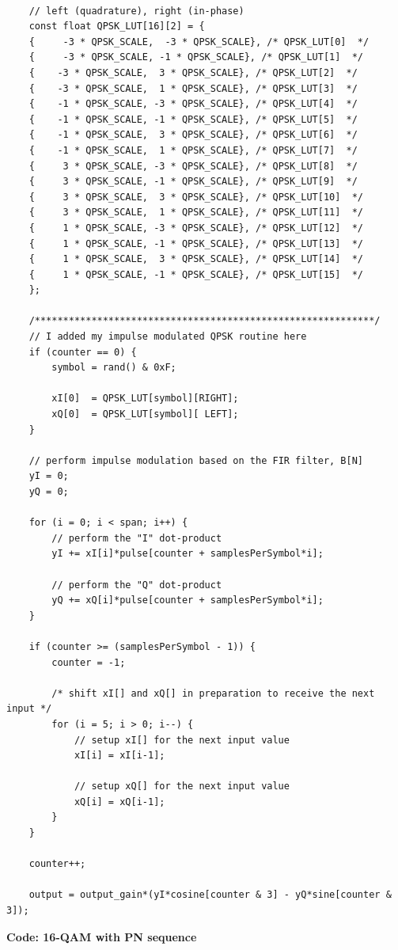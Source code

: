\documentclass{article}
\begin{document}
\begin{verbatim}

	// left (quadrature), right (in-phase)
	const float QPSK_LUT[16][2] = {
	{     -3 * QPSK_SCALE,  -3 * QPSK_SCALE}, /* QPSK_LUT[0]  */
	{     -3 * QPSK_SCALE, -1 * QPSK_SCALE}, /* QPSK_LUT[1]  */
	{    -3 * QPSK_SCALE,  3 * QPSK_SCALE}, /* QPSK_LUT[2]  */
	{    -3 * QPSK_SCALE,  1 * QPSK_SCALE}, /* QPSK_LUT[3]  */
	{    -1 * QPSK_SCALE, -3 * QPSK_SCALE}, /* QPSK_LUT[4]  */
	{    -1 * QPSK_SCALE, -1 * QPSK_SCALE}, /* QPSK_LUT[5]  */
	{    -1 * QPSK_SCALE,  3 * QPSK_SCALE}, /* QPSK_LUT[6]  */
	{    -1 * QPSK_SCALE,  1 * QPSK_SCALE}, /* QPSK_LUT[7]  */
	{     3 * QPSK_SCALE, -3 * QPSK_SCALE}, /* QPSK_LUT[8]  */
	{     3 * QPSK_SCALE, -1 * QPSK_SCALE}, /* QPSK_LUT[9]  */
	{     3 * QPSK_SCALE,  3 * QPSK_SCALE}, /* QPSK_LUT[10]  */
	{     3 * QPSK_SCALE,  1 * QPSK_SCALE}, /* QPSK_LUT[11]  */
	{     1 * QPSK_SCALE, -3 * QPSK_SCALE}, /* QPSK_LUT[12]  */
	{     1 * QPSK_SCALE, -1 * QPSK_SCALE}, /* QPSK_LUT[13]  */
	{     1 * QPSK_SCALE,  3 * QPSK_SCALE}, /* QPSK_LUT[14]  */
	{     1 * QPSK_SCALE, -1 * QPSK_SCALE}, /* QPSK_LUT[15]  */
	};

	/************************************************************/
	// I added my impulse modulated QPSK routine here
	if (counter == 0) {
		symbol = rand() & 0xF;

		xI[0]  = QPSK_LUT[symbol][RIGHT];  
		xQ[0]  = QPSK_LUT[symbol][ LEFT];   
	}

	// perform impulse modulation based on the FIR filter, B[N]
	yI = 0;
	yQ = 0;

	for (i = 0; i < span; i++) {
		// perform the "I" dot-product
		yI += xI[i]*pulse[counter + samplesPerSymbol*i];	

		// perform the "Q" dot-product
		yQ += xQ[i]*pulse[counter + samplesPerSymbol*i];	
	}

	if (counter >= (samplesPerSymbol - 1)) {
		counter = -1; 

		/* shift xI[] and xQ[] in preparation to receive the next input */
		for (i = 5; i > 0; i--) {
			// setup xI[] for the next input value
			xI[i] = xI[i-1];  

			// setup xQ[] for the next input value
			xQ[i] = xQ[i-1];  
		}
	}

	counter++;

	output = output_gain*(yI*cosine[counter & 3] - yQ*sine[counter & 3]);
\end{verbatim}


\textbf{Code: 16-QAM with PN sequence}
\end{document}

